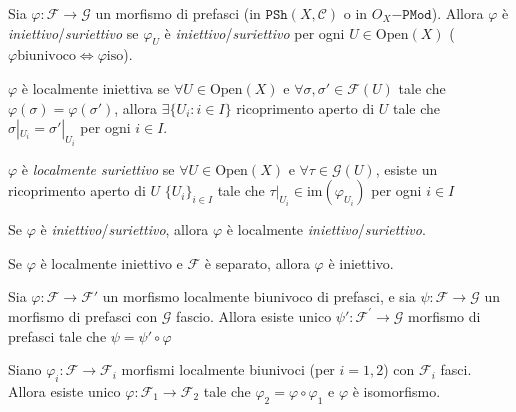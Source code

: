 \begin{definition}{}
    Sia \(\varphi : \mathcal{F}\to \mathcal{G}\) un morfismo di prefasci (in
    \(\mathtt{PSh}{(X, \mathcal{C})}\) o in \(O_X\mathtt{-PMod}\)). Allora
    \(\varphi \) è \emph{iniettivo}/\emph{suriettivo} se \(\varphi _U\) è
    \emph{iniettivo}/\emph{suriettivo} per ogni \(U \in \mathrm{Open}{(X)}\)
    (\(\varphi \text{biunivoco} \iff \varphi \text{iso}\)).

    \(\varphi \) è localmente iniettiva se \(\forall U \in  \mathrm{Open}{(X)}\)
    e \(\forall  \sigma, \sigma' \in  \mathcal{F}{(U)}\) tale che \(\varphi
    {(\sigma)} = \varphi {(\sigma')}\), allora \(\exists  \{U_{i} : i \in I\} \)
    ricoprimento aperto di \(U\) tale che \(\sigma|_{U_{i}} = \sigma'|_{U_{i}}
    \) per ogni \(i \in I\).

    \(\varphi \) è \emph{localmente suriettivo} se \(\forall U \in
    \mathrm{Open}{(X)}\) e \(\forall \tau \in \mathcal{G}{(U)}\), esiste un
    ricoprimento aperto di \(U\) \(\{U_{i}\}_{i \in I}  \) tale che
    \(\tau|_{U_{i}} \in \mathrm{im}{(\varphi _{U_{i}} )}\) per ogni \(i \in I\) 
\end{definition}

\begin{remark}{}
    Se \(\varphi \) è \emph{iniettivo}/\emph{suriettivo}, allora \(\varphi \) è
    localmente \emph{iniettivo}/\emph{suriettivo}.

    Se \(\varphi \) è localmente iniettivo e \(\mathcal{F}\) è separato, allora
    \(\varphi \) è iniettivo.

\end{remark}

\begin{proposition}{}
    Sia \(\varphi : \mathcal{F} \to \mathcal{F}'\) un morfismo localmente
    biunivoco di prefasci, e sia \(\psi : \mathcal{F} \to \mathcal{G}\) un
    morfismo di prefasci con \(\mathcal{G}\) fascio. Allora esiste unico \(\psi'
    : \mathcal{F}^{\prime} \to \mathcal{G}\) morfismo di prefasci tale che
    \(\psi = \psi' \circ \varphi \) 
\end{proposition}

\begin{corollary}{}
    Siano \(\varphi_i : \mathcal{F} \to \mathcal{F}_i\) morfismi localmente
    biunivoci (per \(i=1,2\)) con \(\mathcal{F}_i\) fasci. Allora esiste unico
    \(\varphi : \mathcal{F}_1 \to \mathcal{F}_2\) tale che \(\varphi_{2} =
    \varphi  \circ \varphi_{1}\) e \(\varphi \) è isomorfismo.
\end{corollary}

